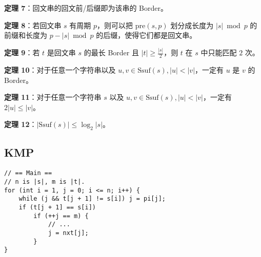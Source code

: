 \begin{tcolorbox}
\textbf{定理 7}：回文串的回文前/后缀即为该串的 Border。
\end{tcolorbox}

\begin{tcolorbox}
\textbf{定理 8}：若回文串 $s$ 有周期 $p$，则可以把 $\mathrm{pre}(s, p)$ 划分成长度为 $|s| \bmod p$ 的前缀和长度为 $p - |s| \bmod p$ 的后缀，使得它们都是回文串。
\end{tcolorbox}

\begin{tcolorbox}
\textbf{定理 9}：若 $t$ 是回文串 $s$ 的最长 Border 且 $|t| \ge \frac{|s|}{2}$，则 $t$ 在 $s$ 中只能匹配 $2$ 次。
\end{tcolorbox}

\begin{tcolorbox}
\textbf{定理 10}：对于任意一个字符串以及 $u, v\in\mathrm{Ssuf}(s), |u| < |v|$，一定有 $u$ 是 $v$ 的 Border。
\end{tcolorbox}

\begin{tcolorbox}
\textbf{定理 11}：对于任意一个字符串 $s$ 以及 $u, v\in\mathrm{Ssuf}(s), |u| < |v|$，一定有 $2|u| \le |v|$。
\end{tcolorbox}

\begin{tcolorbox}
\textbf{定理 12}：$|\mathrm{Ssuf}(s)| \le \log_2|s|$。
\end{tcolorbox}

\subsection{KMP}

\begin{verbatim}
// == Main ==
// n is |s|, m is |t|.
for (int i = 1, j = 0; i <= n; i++) {
    while (j && t[j + 1] != s[i]) j = pi[j];
    if (t[j + 1] == s[i])
        if (++j == m) {
            // ...
            j = nxt[j];
        }
}
\end{verbatim}